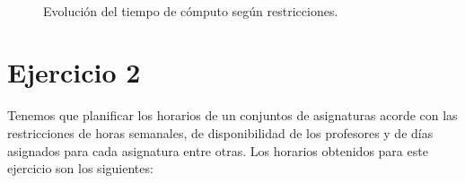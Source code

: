 \documentclass[12pt,letterpaper]{article}
\numberwithin{equation}{section} %
\numberwithin{figure}{section} %
\numberwithin{table}{section} %
\begin{document}
\begin{figure}[H]
    \centering
    \\
    \caption{Evolución del tiempo de cómputo según restricciones.}
\end{figure}

\section{Ejercicio 2}
Tenemos que planificar los horarios de un conjuntos de asignaturas acorde
con las restricciones de horas semanales, de disponibilidad de los profesores
y de días asignados para cada asignatura entre otras. Los horarios obtenidos
para este ejercicio son los siguientes:
\end{document}
